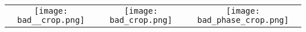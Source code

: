 \begin{tabular}{c @{\hskip 0pt} c @{\hskip 0pt} c }
    \texttt{[image: bad\_\_crop.png]}&
    \texttt{[image: bad\_crop.png]}&
    \texttt{[image: bad\_phase\_crop.png]}
\end{tabular}